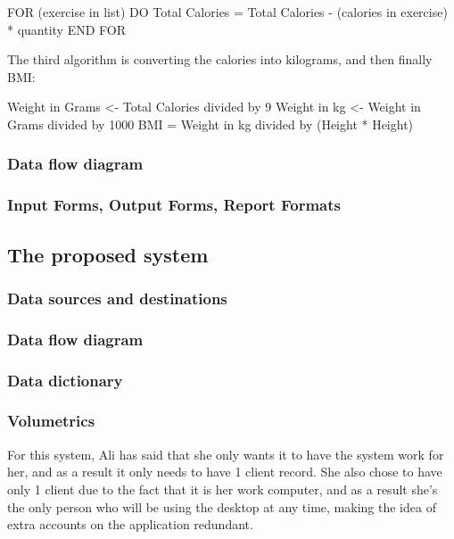 FOR (exercise in list) DO
	Total Calories = Total Calories - (calories in exercise) * quantity
END FOR

The third algorithm is converting the calories into kilograms, and then finally BMI:

Weight in Grams <- Total Calories divided by 9
Weight in kg <- Weight in Grams divided by 1000
BMI = Weight in kg divided by (Height * Height)

\subsubsection{Data flow diagram}

\subsubsection{Input Forms, Output Forms, Report Formats}

\subsection{The proposed system}

\subsubsection{Data sources and destinations}

\subsubsection{Data flow diagram}

\subsubsection{Data dictionary}

\subsubsection{Volumetrics}
For this system, Ali has said that she only wants it to have the system work for her, and as a result it only needs to have 1 client record. She also chose to have only 1 client due to the fact that it is her work computer, and as a result she's the only person who will be using the desktop at any time, making the idea of extra accounts on the application redundant.

